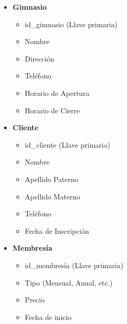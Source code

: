 \documentclass[spanish, 12pt]{article}
\providecommand{\tightlist}{\setlength{\itemsep}{0pt}
\setlength{\parskip}{0pt}}
\begin{document}
	\begin{itemize}
		\tightlist

		\item \textbf{Gimnasio}

			\begin{itemize}
				\tightlist

				\item id\_gimnasio (Llave primaria)

				\item Nombre

				\item Dirección

				\item Teléfono

				\item Horario de Apertura

				\item Horario de Cierre
			\end{itemize}

		\item \textbf{Cliente}

			\begin{itemize}
				\tightlist

				\item id\_cliente (Llave primaria)

				\item Nombre

				\item Apellido Paterno

				\item Apellido Materno

				\item Teléfono

				\item Fecha de Inscripción
			\end{itemize}

		\item \textbf{Membresía}

			\begin{itemize}
				\tightlist

				\item id\_membresía (Llave primaria)

				\item Tipo (Mensual, Anual, etc.)

				\item Precio

				\item Fecha de inicio


\end{itemize}
\end{itemize}
\end{document}

